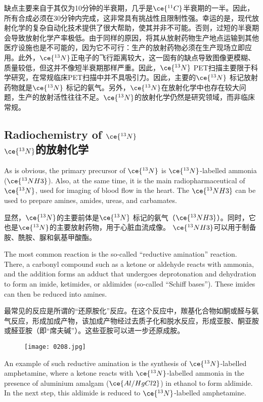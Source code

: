 \documentclass[dvipsnames, svgnames,a4paper,11pt]{article}
\begin{document}
缺点主要来自于其仅为10分钟的半衰期，几乎是\(\ce{^{11}C}\)半衰期的一半。因此，所有合成必须在30分钟内完成，这非常具有挑战性且限制性强。幸运的是，现代放射化学的复杂自动化技术提供了很大帮助，使其并非不可能。否则，过短的半衰期会导致放射化学产率极低。由于同样的原因，将其从放射药物生产地点运输到其他医疗设施也是不可能的，因为它不可行：生产的放射药物必须在生产现场立即应用。此外，\(\ce{^{13}N}\)正电子的飞行距离较大，这一固有的缺点导致图像更模糊、质量较低，但这并不像短半衰期那样严重。因此，\(\ce{^{13}N}\) PET扫描主要限于科学研究，在常规临床PET扫描中并不具吸引力。因此，主要的\(\ce{^{13}N}\) 标记放射药物就是\(\ce{^{13}N}\) 标记的氨气。另外，\(\ce{^{13}N}\)在放射化学中也存在较大问题，生产的放射活性往往不足。\(\ce{^{13}N}\)的放射化学仍然是研究领域，而非临床常规。

\subsection{Radiochemistry of \(\ce{^{13}N}\)\\  \(\ce{^{13}N}\)的放射化学}  
As is obvious, the primary precursor of \(\ce{^{13}N}\) is \(\ce{^{13}N}\)-labelled ammonia (\(\ce{^{13}NH3}\)). Also, at the same time, it is the main radiopharmaceutical of \(\ce{^{13}N}\), used for imaging of blood flow in the heart. The \(\ce{^{13}NH3}\) can be used to prepare amines, amides, ureas, and carbamates.  

显然，\(\ce{^{13}N}\)的主要前体是\(\ce{^{13}N}\) 标记的氨气（\(\ce{^{13}NH3}\)）。同时，它也是\(\ce{^{13}N}\)的主要放射药物，用于心脏血流成像。 \(\ce{^{13}NH3}\)可以用于制备胺、酰胺、脲和氨基甲酸酯。

The most common reaction is the so-called “reductive amination” reaction. There, a carbonyl compound such as a ketone or aldehyde reacts with ammonia, and the addition forms an adduct that undergoes deprotonation and dehydration to form an imide, ketimides, or aldimides (so-called “Schiff bases”). These imides can then be reduced into amines.

最常见的反应是所谓的“还原胺化”反应。在这个反应中，羰基化合物如酮或醛与氨气反应，形成加成产物，该加成产物经过去质子化和脱水反应，形成亚胺、酮亚胺或醛亚胺（即“席夫碱”）。这些亚胺可以进一步还原成胺。

\begin{figure*}[h]
	\centering
    \texttt{[image: 0208.jpg]}  
\end{figure*}

An example of such reductive amination is the synthesis of \(\ce{^{13}N}\)-labelled amphetamine, where a ketone reacts with \(\ce{^{13}N}\)-labelled ammonia in the presence of aluminium amalgam (\(\ce{Al/HgCl2}\)) in ethanol to form aldimide. In the next step, this aldimide is reduced to \(\ce{^{13}N}\)-labelled amphetamine.
\end{document}
